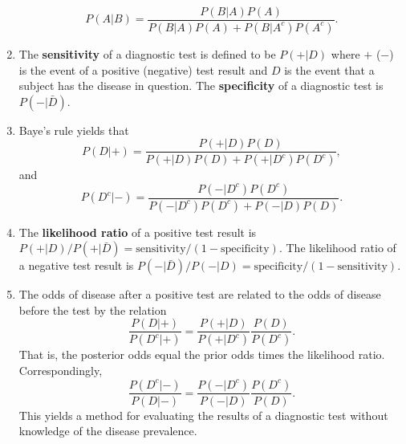 \documentclass[12pt]{article}
\begin{document}
\begin{enumerate}[1.]
    $$
    P(A | B) = \frac{P(B | A) P(A)}{P(B | A) P(A) + P(B | A^c) P(A^c)}.
    $$
    \item The {\bf sensitivity} of a diagnostic test is defined to
    be $P(+ | D)$ where $+$ ($-$) is the event of a positive
    (negative) test result and $D$ is the event that a subject has the
    disease in question. The {\bf specificity} of a diagnostic test is
    $P(- | \bar D)$.
    \item Baye's rule yields that
      $$
      P(D | + ) = \frac{P(+ | D) P(D)}{P(+ | D) P(D) + P(+ | D^c) P(D^c)},
      $$
      and 
      $$
      P(D^c | -) = \frac{P(- | D^c) P(D^c)}{P(- | D^c) P(D^c) + P(- | D) P(D)}.
      $$
    \item The {\bf likelihood ratio} of a positive test result is
      $P(+ | D) / P(+ | \bar D) = \mbox{sensitivity} / (1 - \mbox{specificity})$.
      The likelihood ratio of a negative test result is
      $P(- | \bar D) / P(- | D) = \mbox{specificity} / (1 - \mbox{sensitivity})$.
    \item The odds of disease after a positive test are related to the odds of disease
      before the test by the relation
      $$
      \frac{P(D | +)}{P(D^c | +)} = \frac{P(+ | D)}{P(+ | D^c)} \frac{P(D)}{P(D^c)}.
      $$
      That is, the posterior odds equal the prior odds times the likelihood ratio.
      Correspondingly,
      $$
      \frac{P(D^c | -)}{P(D | -)} = \frac{P(- | D^c)}{P(- | D)} \frac{P(D^c)}{P(D)}.
      $$
      This yields a method for evaluating the results of a diagnostic test without
      knowledge of the disease prevalence.
  \end{enumerate}
\end{document}
